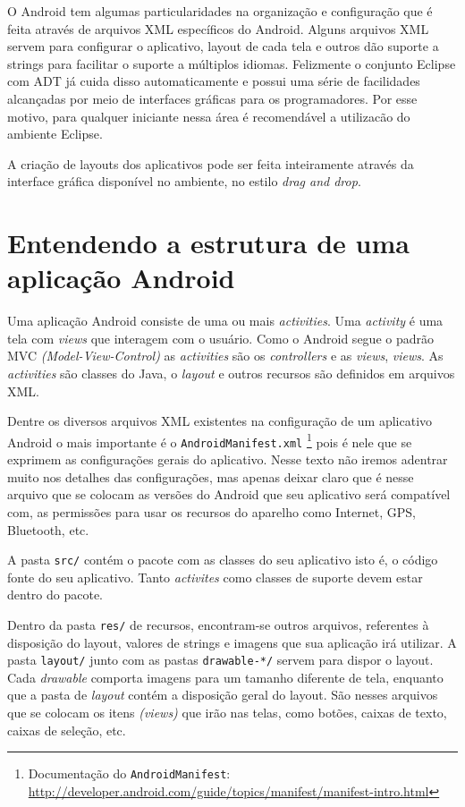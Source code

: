 \documentclass[a4paper,12pt,brazil]{book}
\begin{document}
O Android tem algumas particularidades na organização e configuração que é feita através de arquivos XML específicos do Android. Alguns arquivos XML servem para configurar o aplicativo, layout de cada tela e outros dão suporte a strings para facilitar o suporte a múltiplos idiomas.
Felizmente o conjunto Eclipse com ADT já cuida disso automaticamente e possui uma série de facilidades alcançadas por meio de interfaces gráficas para os programadores. Por esse motivo, para qualquer iniciante nessa área é recomendável a utilizacão do ambiente Eclipse.

A criação de layouts dos aplicativos pode ser feita inteiramente através da interface gráfica disponível no ambiente, no estilo \textit{drag and drop}. 

\section{Entendendo a estrutura de uma aplicação Android}

Uma aplicação Android consiste de uma ou mais \emph{activities}. Uma \emph{activity} é uma tela com \emph{views} que interagem com o usuário. Como o Android segue o padrão MVC \emph{(Model-View-Control)} as \emph{activities} são os \emph{controllers} e as \emph{views}, \emph{views}. As \emph{activities} são classes do Java, o \emph{layout} e outros recursos são definidos em arquivos XML.

Dentre os diversos arquivos XML existentes na configuração de um aplicativo Android o mais importante é o \texttt{{AndroidManifest.xml}}
\footnote{Documentação do \texttt{AndroidManifest}: \href{The AndroidManifest.xml File}{http://developer.android.com/guide/topics/manifest/manifest-intro.html}}
 pois é nele que se exprimem as configurações gerais do aplicativo. Nesse texto não iremos adentrar muito nos detalhes das configurações, mas apenas deixar claro que é nesse arquivo que se colocam as versões do Android que seu aplicativo será compatível com, as permissões para usar os recursos do aparelho como Internet, GPS, Bluetooth, etc. 
 
 A pasta \texttt{src/} contém o pacote com as classes do seu aplicativo isto é, o código fonte do seu aplicativo. Tanto \emph{activites} como classes de suporte devem estar dentro do pacote.

Dentro da pasta \texttt{res/} de recursos, encontram-se outros arquivos, referentes à disposição do layout, valores de strings e imagens que sua aplicação irá utilizar. A pasta \texttt{layout/} junto com as pastas \texttt{drawable-*/} servem para dispor o layout. Cada \textit{drawable} comporta imagens para um tamanho diferente de tela, enquanto que a pasta de \textit{layout} contém a disposição geral do layout. São nesses arquivos que se colocam os itens \emph{(views)} que irão nas telas, como botões, caixas de texto, caixas de seleção, etc.
\end{document}
